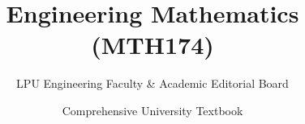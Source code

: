 \documentclass[a4paper,11pt,oneside,openany]{book}
\title{Engineering Mathematics (MTH174)}
\author{LPU Engineering Faculty \& Academic Editorial Board}
\date{Comprehensive University Textbook}
\begin{document}
\frontmatter

\makebookcover
\copyrightpage
\disclaimerpage

\tableofcontents
\newpage

\mainmatter







\end{document}
